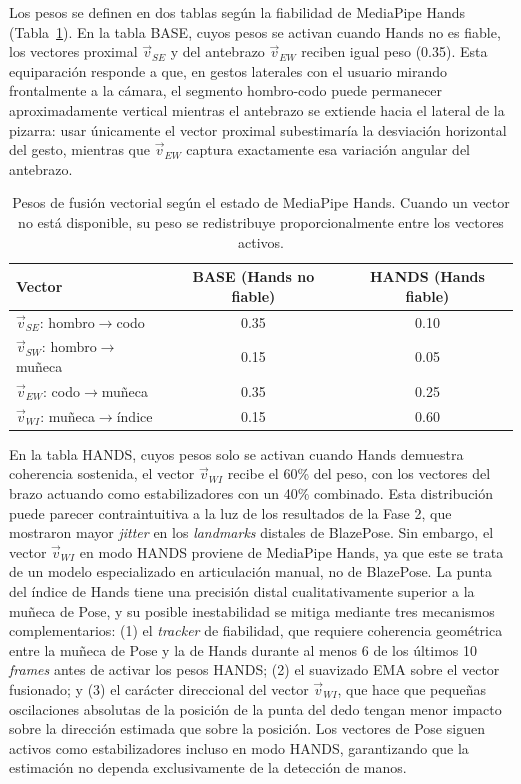 \documentclass[12pt]{report} %
\begin{document}
Los pesos se definen en dos tablas según la fiabilidad de MediaPipe Hands (Tabla~\ref{tab:pesos}). En la tabla BASE, cuyos pesos se activan cuando Hands no es fiable, los vectores proximal $\vec{v}_{SE}$ y del antebrazo $\vec{v}_{EW}$ reciben igual peso (0.35). Esta equiparación responde a que, en gestos laterales con el usuario mirando frontalmente a la cámara, el segmento hombro-codo puede permanecer aproximadamente vertical mientras el antebrazo se extiende hacia el lateral de la pizarra: usar únicamente el vector proximal subestimaría la desviación horizontal del gesto, mientras que $\vec{v}_{EW}$ captura exactamente esa variación angular del antebrazo.

\begin{table}[H]
\caption{\label{tab:pesos}Pesos de fusión vectorial según el estado de MediaPipe Hands. Cuando un vector no está disponible, su peso se redistribuye proporcionalmente entre los vectores activos.}
\begin{tabular}{lcc}
\hline
\textbf{Vector} & \textbf{BASE (Hands no fiable)} & \textbf{HANDS (Hands fiable)} \\
\hline
$\vec{v}_{SE}$: hombro$\rightarrow$codo     & 0.35 & 0.10 \\
$\vec{v}_{SW}$: hombro$\rightarrow$muñeca   & 0.15 & 0.05 \\
$\vec{v}_{EW}$: codo$\rightarrow$muñeca     & 0.35 & 0.25 \\
$\vec{v}_{WI}$: muñeca$\rightarrow$índice   & 0.15 & 0.60 \\
\hline
\end{tabular}
\end{table}

En la tabla HANDS, cuyos pesos solo se activan cuando Hands demuestra coherencia sostenida, el vector $\vec{v}_{WI}$ recibe el 60\% del peso, con los vectores del brazo actuando como estabilizadores con un 40\% combinado. Esta distribución puede parecer contraintuitiva a la luz de los resultados de la Fase 2, que mostraron mayor \textit{jitter} en los \textit{landmarks} distales de BlazePose. Sin embargo, el vector $\vec{v}_{WI}$ en modo HANDS proviene de MediaPipe Hands, ya que este se trata de un modelo especializado en articulación manual, no de BlazePose. La punta del índice de Hands tiene una precisión distal cualitativamente superior a la muñeca de Pose, y su posible inestabilidad se mitiga mediante tres mecanismos complementarios: (1) el \textit{tracker} de fiabilidad, que requiere coherencia geométrica entre la muñeca de Pose y la de Hands durante al menos 6 de los últimos 10 \textit{frames} antes de activar los pesos HANDS; (2) el suavizado EMA sobre el vector fusionado; y (3) el carácter direccional del vector $\vec{v}_{WI}$, que hace que pequeñas oscilaciones absolutas de la posición de la punta del dedo tengan menor impacto sobre la dirección estimada que sobre la posición. Los vectores de Pose siguen activos como estabilizadores incluso en modo HANDS, garantizando que la estimación no dependa exclusivamente de la detección de manos.
\end{document}
